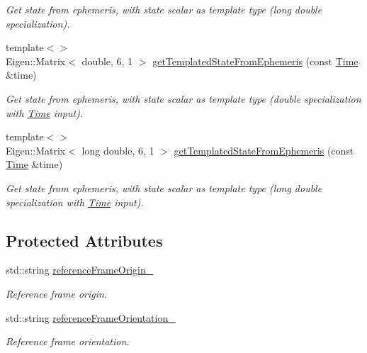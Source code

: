 \begin{DoxyCompactItemize}
\begin{DoxyCompactList}\small\item\em Get state from ephemeris, with state scalar as template type (long double specialization). \end{DoxyCompactList}\item 
{\footnotesize template$<$$>$ }\\Eigen\+::\+Matrix$<$ double, 6, 1 $>$ \hyperlink{classtudat_1_1ephemerides_1_1Ephemeris_aeec130c7f778a1d0c06fda7476d9ca75}{get\+Templated\+State\+From\+Ephemeris} (const \hyperlink{classtudat_1_1Time}{Time} \&time)\hypertarget{classtudat_1_1ephemerides_1_1Ephemeris_aeec130c7f778a1d0c06fda7476d9ca75}{}\label{classtudat_1_1ephemerides_1_1Ephemeris_aeec130c7f778a1d0c06fda7476d9ca75}

\begin{DoxyCompactList}\small\item\em Get state from ephemeris, with state scalar as template type (double specialization with \hyperlink{classtudat_1_1Time}{Time} input). \end{DoxyCompactList}\item 
{\footnotesize template$<$$>$ }\\Eigen\+::\+Matrix$<$ long double, 6, 1 $>$ \hyperlink{classtudat_1_1ephemerides_1_1Ephemeris_a0ec66ebe15e2bf0516448ff79cdd3012}{get\+Templated\+State\+From\+Ephemeris} (const \hyperlink{classtudat_1_1Time}{Time} \&time)\hypertarget{classtudat_1_1ephemerides_1_1Ephemeris_a0ec66ebe15e2bf0516448ff79cdd3012}{}\label{classtudat_1_1ephemerides_1_1Ephemeris_a0ec66ebe15e2bf0516448ff79cdd3012}

\begin{DoxyCompactList}\small\item\em Get state from ephemeris, with state scalar as template type (long double specialization with \hyperlink{classtudat_1_1Time}{Time} input). \end{DoxyCompactList}\end{DoxyCompactItemize}
\subsection*{Protected Attributes}
\begin{DoxyCompactItemize}
\item 
std\+::string \hyperlink{classtudat_1_1ephemerides_1_1Ephemeris_a69d6996ff459ef971f07b4f826528531}{reference\+Frame\+Origin\+\_\+}
\begin{DoxyCompactList}\small\item\em Reference frame origin. \end{DoxyCompactList}\item 
std\+::string \hyperlink{classtudat_1_1ephemerides_1_1Ephemeris_a423f4cfbc075f421a16b07bea53ca939}{reference\+Frame\+Orientation\+\_\+}
\begin{DoxyCompactList}\small\item\em Reference frame orientation. \end{DoxyCompactList}\end{DoxyCompactItemize}


